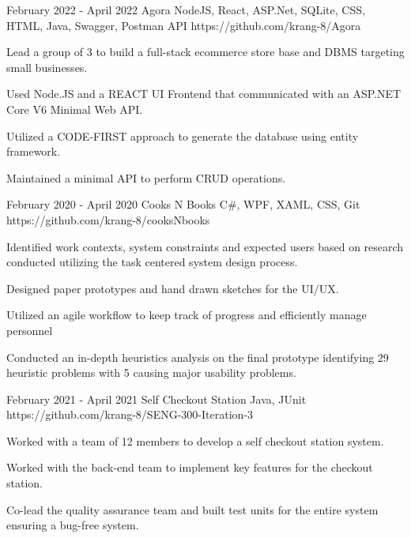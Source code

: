 \documentclass[]{awesome-cv}
\begin{document}
\vspace{-5mm}
\vspace{-3mm}
\begin{cventries}
	  \cventry
	{February 2022 - April 2022}
    {Agora}
	{NodeJS, React, ASP.Net, SQLite, CSS, HTML, Java, Swagger, Postman API}
	{https://github.com/krang-8/Agora}
    {
      \begin{cvitems} %
        \item {Lead a group of 3 to build a full-stack ecommerce store base and DBMS targeting small businesses.}
        \item {Used Node.JS and a REACT UI Frontend that communicated with an ASP.NET Core V6 Minimal Web API.}
        \item {Utilized a CODE-FIRST approach to generate the database using entity framework.}
        \item {Maintained a minimal API to perform CRUD operations.}
      \end{cvitems}
    }
    	\vspace{1mm}

		  \cventry
	{February 2020 - April 2020}
	{Cooks N Books}
	{C\#, WPF, XAML, CSS, Git }
	{https://github.com/krang-8/cooksNbooks}
    {
      \begin{cvitems} %
        \item {Identified work contexts, system constraints and expected users based on research conducted utilizing the task centered system design process.}
        \item {Designed paper prototypes and hand drawn sketches for the UI/UX.}
        \item {Utilized an agile workflow to keep track of progress and efficiently manage personnel}
        \item { Conducted an in-depth heuristics analysis on the final prototype identifying 29 heuristic problems with 5 
causing major usability problems.}
      \end{cvitems}
    }
        	\vspace{1mm}

	  \cventry
	{February 2021 - April 2021}
    {Self Checkout Station}
	{Java, JUnit}
	{https://github.com/krang-8/SENG-300-Iteration-3}
    {
      \begin{cvitems} %
        \item {Worked with a team of 12 members to develop a self checkout station system.}
        \item {Worked with the back-end team to implement key features for the checkout station.}
        \item {Co-lead the quality assurance team and built test units for the entire system ensuring a bug-free system.}
      \end{cvitems}
    }
    	\vspace{1mm}


\end{cventries}
\end{document}
